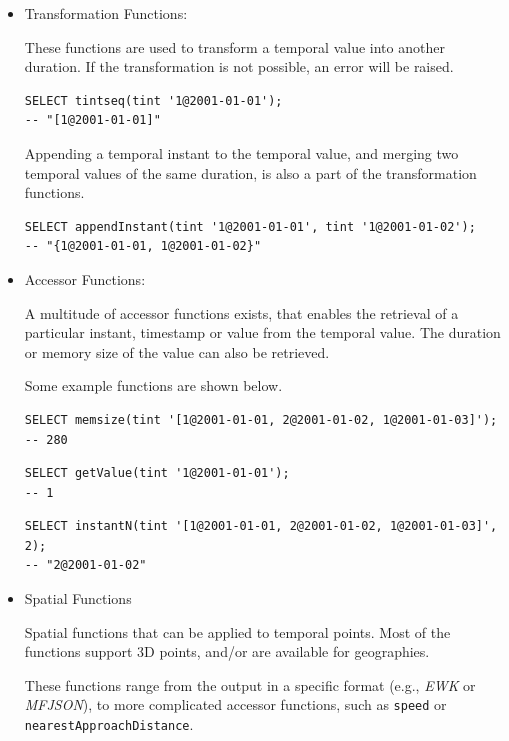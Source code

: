 \begin{itemize}
    \item Transformation Functions:

        These functions are used to transform a temporal value into another duration. If the transformation is not possible, an error will be raised. 

        \begin{lstlisting}
SELECT tintseq(tint '1@2001-01-01');
-- "[1@2001-01-01]"
        \end{lstlisting}

        Appending a temporal instant to the temporal value, and merging two temporal values of the same duration, is also a part of the transformation functions.

        \begin{lstlisting}
SELECT appendInstant(tint '1@2001-01-01', tint '1@2001-01-02');
-- "{1@2001-01-01, 1@2001-01-02}"
        \end{lstlisting}

    \item Accessor Functions:

        A multitude of accessor functions exists, that enables the retrieval of a particular instant, timestamp or value from the temporal value. The duration or memory size of the value can also be retrieved.

        Some example functions are shown below.

        \begin{lstlisting}
SELECT memsize(tint '[1@2001-01-01, 2@2001-01-02, 1@2001-01-03]');
-- 280
        \end{lstlisting}

        \begin{lstlisting}
SELECT getValue(tint '1@2001-01-01');
-- 1
        \end{lstlisting}

        \begin{lstlisting}
SELECT instantN(tint '[1@2001-01-01, 2@2001-01-02, 1@2001-01-03]', 2);
-- "2@2001-01-02"
        \end{lstlisting}

    \item Spatial Functions

        Spatial functions that can be applied to temporal points. Most of the functions support 3D points, and/or are available for geographies.

        These functions range from the output in a specific format (e.g., \textit{EWK} or \textit{MFJSON}), to more complicated accessor functions, such as \lstinline{speed} or \lstinline{nearestApproachDistance}.


\end{itemize}
